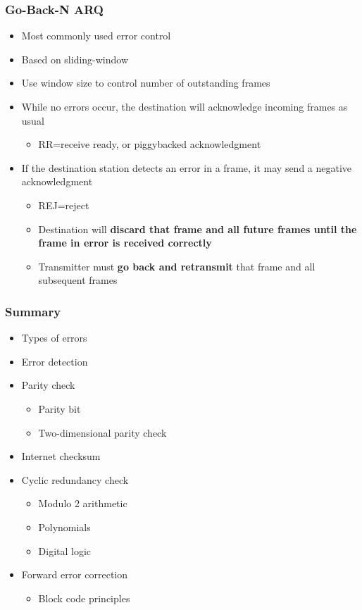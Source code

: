 \documentclass[pdflatex,compress]{beamer}
\begin{document}
\begin{frame}
	\frametitle{Go-Back-N ARQ}
	\begin{itemize}
		\item Most commonly used error control
		\item Based on sliding-window
		\item Use window size to control number of outstanding frames
		\item While no errors occur, the destination will acknowledge incoming frames as usual
		\begin{itemize}
			\item RR=receive ready, or piggybacked acknowledgment
		\end{itemize}
		\item If the destination station detects an error in a frame, it may send a negative acknowledgment
		\begin{itemize}
			\item REJ=reject
			\item Destination will \textbf{discard that frame and all future frames until the frame in error is received correctly}
			\item Transmitter must \textbf{go back and retransmit} that frame and all subsequent frames
		\end{itemize}
	\end{itemize}
\end{frame}

\begin{frame}
	\frametitle{Summary}
	\begin{multicols}{2}
	\begin{itemize}
		\item Types of errors
		\item Error detection
		\item Parity check
		\begin{itemize}
			\item Parity bit
			\item Two-dimensional parity check
		\end{itemize}
		\item Internet checksum
		\item Cyclic redundancy check
		\begin{itemize}
			\item Modulo 2 arithmetic
			\item Polynomials
			\item Digital logic
		\end{itemize}
		\item Forward error correction
		\begin{itemize}
			\item Block code principles
		\end{itemize}
	\end{itemize}
	\end{multicols}
\end{frame}
\end{document}
